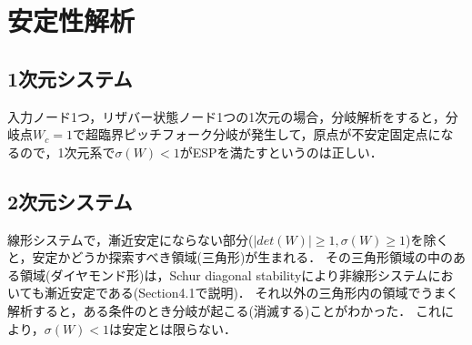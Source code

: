 \documentclass[10pt]{jsarticle}
\begin{document}
\section{安定性解析}
\subsection{1次元システム}
入力ノード1つ，リザバー状態ノード1つの1次元の場合，分岐解析をすると，分岐点$W_c=1$で超臨界ピッチフォーク分岐が発生して，原点が不安定固定点になるので，1次元系で$\sigma(W)<1$がESPを満たすというのは正しい．

\subsection{2次元システム}
線形システムで，漸近安定にならない部分($|det(W)|\geq 1, \sigma(W)\geq 1$)を除くと，安定かどうか探索すべき領域(三角形)が生まれる．
その三角形領域の中のある領域(ダイヤモンド形)は，Schur diagonal stabilityにより非線形システムにおいても漸近安定である(Section4.1で説明)．
それ以外の三角形内の領域でうまく解析すると，ある条件のとき分岐が起こる(消滅する)ことがわかった．
これにより，$\sigma(W)<1$は安定とは限らない．
\end{document}
